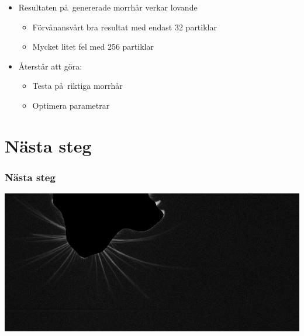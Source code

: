 \documentclass[]{beamer}
\renewcommand{\ae}{\"{a}}
\renewcommand{\oe}{\"{o}}
\begin{document}
\begin{frame}
  \begin{itemize}
  \item Resultaten p\aa\ genererade morrh\aa r verkar lovande
    \begin{itemize}
      \item F\oe rv\aa nansv\aa rt bra resultat med endast 32 partiklar
      \item Mycket litet fel med 256 partiklar
      \end{itemize}
  \item \AA terst\aa r att g\oe ra:
    \begin{itemize}
    \item Testa p\aa\ riktiga morrh\aa r
    \item Optimera parametrar
    \end{itemize}
  \end{itemize}
\end{frame}

\section{N\ae sta steg}
\begin{frame}
  \frametitle{N\ae sta steg}
  \includegraphics[width=1\textwidth]{preprocessing/frame-0759_whiskers.png}
\end{frame}
\end{document}

